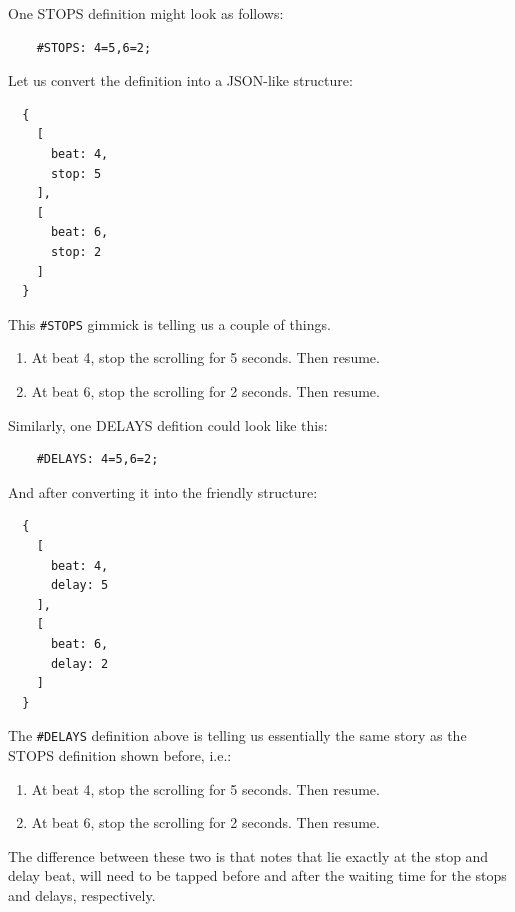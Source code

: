 \documentclass[a4paper,9pt]{article}
\begin{document}
One STOPS definition might look as follows:

\begin{verbatim}
    #STOPS: 4=5,6=2;
\end{verbatim}

Let us convert the definition into a JSON-like structure:

    \begin{verbatim}
  {
    [
      beat: 4,
      stop: 5 
    ],
    [
      beat: 6,
      stop: 2 
    ]
  }
    \end{verbatim}

    This \texttt{\#STOPS} gimmick is telling us a couple of things.
    \begin{enumerate}
	    \item At beat 4, stop the scrolling for 5 seconds. Then resume.
	    \item At beat 6, stop the scrolling for 2 seconds. Then resume.
    \end{enumerate}

Similarly, one DELAYS defition could look like this:
\begin{verbatim}
    #DELAYS: 4=5,6=2;
\end{verbatim}

And after converting it into the friendly structure:

    \begin{verbatim}
  {
    [
      beat: 4,
      delay: 5 
    ],
    [
      beat: 6,
      delay: 2 
    ]
  }
    \end{verbatim}
    The \texttt{\#DELAYS} definition above is telling us essentially the same story as the STOPS definition shown before, i.e.: 
    \begin{enumerate}
	    \item At beat 4, stop the scrolling for 5 seconds. Then resume.
	    \item At beat 6, stop the scrolling for 2 seconds. Then resume.
    \end{enumerate}

    The difference between these two is that notes that lie exactly at the stop and delay beat, will need to be tapped before and after the waiting time for the stops and delays, respectively.
\end{document}
